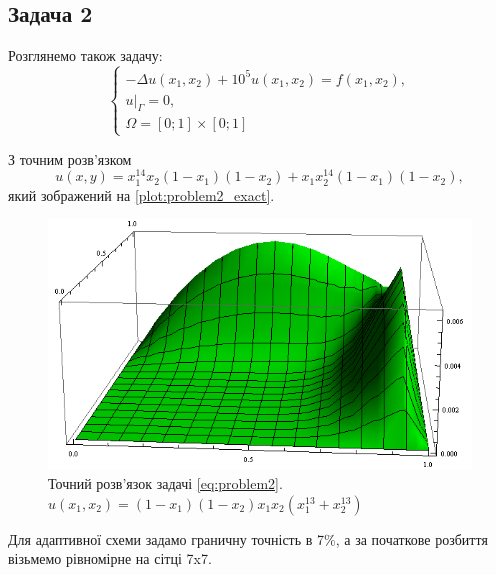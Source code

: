 
\subsection{Задача 2}

Розглянемо також задачу:
\begin{equation}\label{eq:problem2}
\begin{cases}
	- \Delta u(x_1,x_2) + 10^5 u(x_1, x_2) = f(x_1,x_2), \\
	u|_\Gamma = 0 ,\\
	\Omega = \left[0;1\right] \times \left[0;1\right]
\end{cases}
\end{equation}

З точним розв'язком
\begin{equation}
	u(x,y) = x_1^{14}x_2(1-x_1)(1-x_2)+x_1 x_2^{14}(1-x_1)(1-x_2),
\end{equation}
%
який зображений на \autoref{plot:problem2_exact}.
\begin{figure}[H]
	\centering
    \includegraphics[scale=0.7]{problem2/ExactSolution}
    \captionsetup{format=hang,justification=centering}
    \caption{Точний розв'язок задачі \eqref{eq:problem2}. \newline $u(x_1,x_2) = (1-x_1)(1-x_2)x_1x_2(x_1^{13}+x_2^{13})$ }
    \label{plot:problem2_exact}
\end{figure}

Для адаптивної схеми задамо граничну точність в 7\%, а за початкове розбиття візьмемо рівномірне на сітці 7x7.

